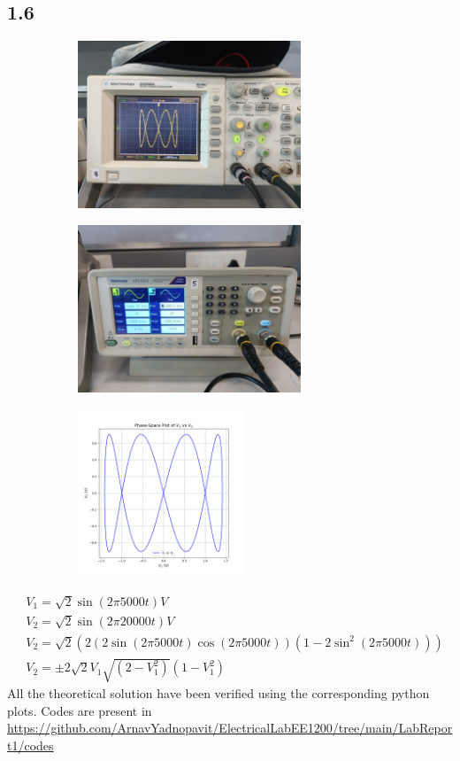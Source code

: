 \documentclass[a4paper,12pt]{article}
\begin{document}
\subsection*{1.6}
\begin{figure}[H]
    \centering
    \begin{subfigure}{0.5\textwidth}
        \centering
        \includegraphics[height=5cm]{figs/6/plot.jpeg}
    \end{subfigure}%
    \begin{subfigure}{0.5\textwidth}
        \centering
        \includegraphics[height=5cm]{figs/6/para.jpeg}
    \end{subfigure}
    \begin{subfigure}{0.5\textwidth}
        \centering
        \includegraphics[height=5cm]{figs/6/pyplot.png}
    \end{subfigure}%
\end{figure}
\begin{align}
    &V_1=\sqrt{2}\sin(2\pi 5000t) V\\
    &V_2=\sqrt{2}\sin(2\pi 20000t) V\\
    &V_2=\sqrt{2}(2(2\sin(2\pi 5000t)\cos(2\pi 5000t))(1-2\sin^2(2\pi 5000t)))\\
    &V_2=\pm2\sqrt{2}V_1\sqrt{(2-V_1^2)}(1-V_1^2)
\end{align}
All the theoretical solution have been verified using the corresponding python plots. Codes are present in \url{https://github.com/ArnavYadnopavit/ElectricalLabEE1200/tree/main/LabReport1/codes}
\end{document}
